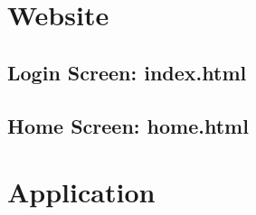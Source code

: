 \documentclass[../report.tex]{subfiles}
\begin{document}
\section{Website}
\subsection{Login Screen: index.html}

\subsection{Home Screen: home.html}
\section{Application}
\end{document}
